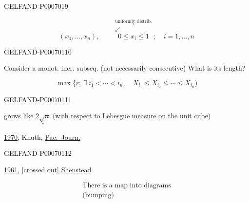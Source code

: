 \begin{GelfandAdjacentEvidence}{GELFAND-P000701}{9}

\[
(x_1,\ldots,x_n),\qquad
\overset{\substack{\underline{\text{uniformly distrib.}}\\\swarrow}}{0\le x_i\le1};
\quad i=1,\ldots,n
\]
\end{GelfandAdjacentEvidence}
\begin{GelfandAdjacentEvidence}{GELFAND-P000701}{10}


Consider a monot. incr. subseq. (not necessarily consecutive) What is its length?

\[
\max\{r;\ \exists\ i_1<\cdots<i_n,\quad X_{i_1}\le X_{i_2}\le\cdots\le X_{i_n})
\]
\end{GelfandAdjacentEvidence}
\begin{GelfandAdjacentEvidence}{GELFAND-P000701}{11}


grows like \(\underline{\underline{2\sqrt n}}\) (with respect to Lebesgue measure on the unit cube)

\underline{1970}, Knuth, \href{https://msp.org/pjm/1970/34-3/pjm-v34-n3-p09-p.pdf}{Pac.\ Journ.}
\end{GelfandAdjacentEvidence}
\begin{GelfandAdjacentEvidence}{GELFAND-P000701}{12}


\underline{1961}, [crossed out] \href{https://doi.org/10.4153/CJM-1961-015-3}{Shenstead}
\end{GelfandAdjacentEvidence}


\[
\begin{array}{||l}
\text{There is a map into diagrams}\\
\text{(bumping)}
\end{array}
\]


